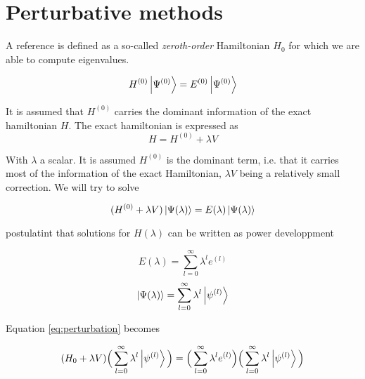 \documentclass[./thesis.tex]{subfiles}
\begin{document}
\section{Perturbative methods}


A reference is defined as a so-called \emph{zeroth-order} Hamiltonian $H_0$ for which we are able to compute eigenvalues. 

\begin{equation}
\label{eq:zerothordez}
H^{(0)} \ket {\Psi^{(0)}} = E^{(0)} \ket{\Psi^{(0)}}
\end{equation}

It is assumed that $H^{(0)}$ carries the dominant information of the exact hamiltonian $H$.
The exact hamiltonian is expressed as
\begin{equation}
H = H^{(0)} + \lambda V
\end{equation}

With $\lambda$ a scalar. It is assumed $H^{(0)}$ is the dominant term, i.e. that it carries most of the information of the exact Hamiltonian, $\lambda V$ being a relatively small correction.
We will try to solve

\begin{equation}
\label{eq:perturbation}
(H^{(0)} + \lambda V) \ket {\Psi (\lambda)} = E(\lambda)\ket {\Psi (\lambda)}
\end{equation}

postulatint that solutions for $H(\lambda)$ can be written as power developpment

\begin{equation}
E(\lambda) = \sum_{l=0}^{\infty} \lambda^l e^{(l)} 
\end{equation}
\begin{equation}
\ket {\Psi (\lambda)} = \sum_{l=0}^{\infty} \lambda^l \ket {\psi^{(l)}} 
\end{equation}

Equation \ref{eq:perturbation} becomes

\begin{equation}
(H_0 + \lambda V) \Big ( \sum_{l=0}^{\infty} \lambda^l \ket {\psi^{(l)}} \Big )  = \Big ( \sum_{l=0}^{\infty} \lambda^l e^{(l)} \Big ) \Big ( \sum_{l=0}^{\infty} \lambda^l \ket {\psi^{(l)}} \Big )
\end{equation}
\end{document}
